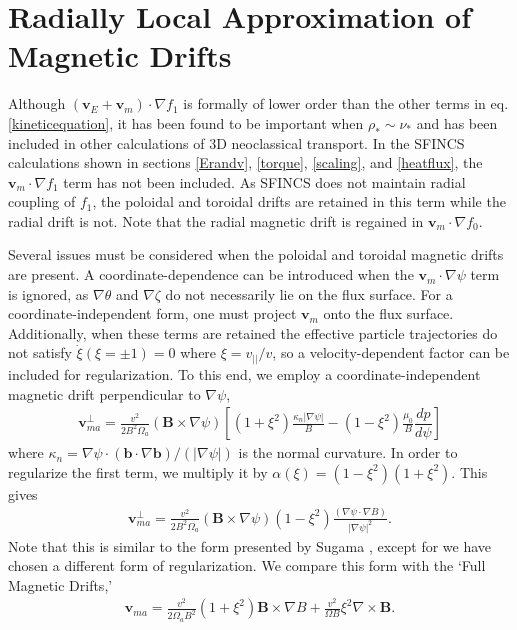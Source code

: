 \documentclass{article}
\numberwithin{figure}{section}
\numberwithin{equation}{section}
\newcommand{\der}[2]{\dfrac{d #1}{d  #2}}
\begin{document}
\FloatBarrier

\section{Radially Local Approximation of Magnetic Drifts}\label{mds}
Although $(\bm{v}_E + \bm{v}_m) \cdot \nabla f_1$ is formally of lower order than the other terms in eq. \ref{kineticequation}, it has been found to be important when $\rho_* \sim \nu_*$ and has been included in other calculations of 3D neoclassical transport. In the SFINCS calculations shown in sections \ref{Erandv}, \ref{torque}, \ref{scaling}, and \ref{heatflux}, the $\bm{v}_m \cdot \nabla f_1$ term has not been included. As SFINCS does not maintain radial coupling of $f_1$, the poloidal and toroidal drifts are retained in this term while the radial drift is not. Note that the radial magnetic drift is regained in $\bm{v}_m \cdot \nabla f_0$. 

Several issues must be considered when the poloidal and toroidal magnetic drifts are present. A coordinate-dependence can be introduced when the $\bm{v}_m \cdot \nabla \psi$ term is ignored, as $\nabla \theta$ and $\nabla \zeta$ do not necessarily lie on the flux surface. For a coordinate-independent form, one must project $\bm{v}_m$ onto the flux surface. Additionally, when these terms are retained the effective particle trajectories do not satisfy $\dot{\xi} (\xi = \pm 1) = 0$ where $\xi = v_{||}/v$, so a velocity-dependent factor can be included for regularization. To this end, we employ a coordinate-independent magnetic drift perpendicular to $\nabla \psi$,
\begin{gather}
\bm{v}_{ma}^{\perp} = \frac{v^2}{2B^2 \Omega_a} (\bm{B} \times \nabla \psi) \left[(1+\xi^2) \frac{\kappa_n \rvert \nabla \psi \rvert}{B} - (1 - \xi^2) \frac{\mu_0}{B} \der{p}{\psi} \right] 
\end{gather}
where $\kappa_n = \nabla \psi \cdot (\bm{b} \cdot \nabla \bm{b})/(\rvert \nabla \psi \rvert)$ is the normal curvature. In order to regularize the first term, we multiply it by $\alpha(\xi) = (1-\xi^2)(1+\xi^2)$. This gives
\begin{gather}
\bm{v}_{ma}^{\perp} = \frac{v^2}{2B^2 \Omega_a} (\bm{B} \times \nabla \psi) (1 - \xi^2) \frac{(\nabla \psi \cdot \nabla B)}{\rvert \nabla \psi \rvert^2}.
\end{gather}
Note that this is similar to the form presented by Sugama \cite{Sugama2016}, except for we have chosen a different form of regularization. We compare this form with the `Full Magnetic Drifts,' 
\begin{gather}
\bm{v}_{ma} = \frac{v^2}{2 \Omega_a B^2} (1 + \xi^2) \bm{B} \times \nabla B + \frac{v^2}{\Omega B} \xi^2 \nabla \times \bm{B}.
\end{gather}
\end{document}
